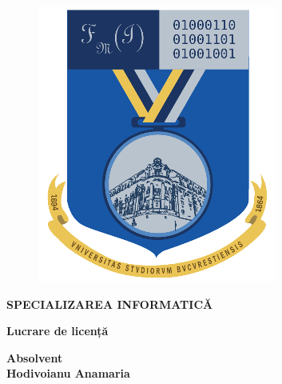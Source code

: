 \begin{titlepage}
\begin{figure}[!htb]
\begin{minipage}{0.5\textwidth}
        \end{minipage}
        \begin{minipage}{0.2\textwidth}
            \includegraphics[width=\linewidth]{"images/logo-fmi.png"}
        \end{minipage}
    \end{figure}
    
    \begin{center}
    \textbf{SPECIALIZAREA INFORMATICĂ}
    \end{center}
    
    \vspace{1cm}
    
    \begin{center}
    \Large \textbf{Lucrare de licență}
    \end{center}
    
    \begin{center}
    \huge \textbf{\MakeUppercase{\@title}}
    \end{center}
    
    \vspace{3cm}
    
    \begin{center}
    \large \textbf{Absolvent \\ Hodivoianu Anamaria}
    \end{center}
    

\end{titlepage}
